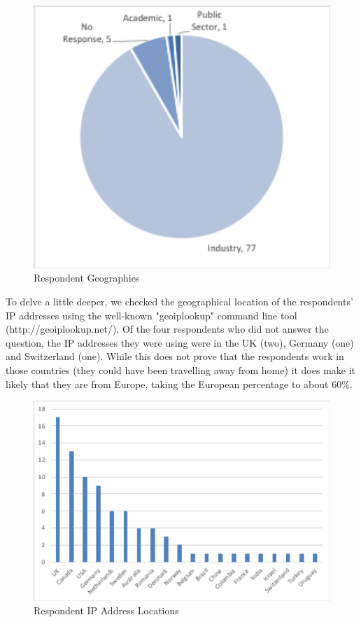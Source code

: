 \begin{figure}
\centering
\includegraphics[width=12cm]{Figures/prioritisation-workenv}
\caption{Respondent Geographies}
\label{figure:geographies}
\end{figure}

To delve a little deeper, we checked the geographical location of the respondents' IP addresses using the well-known "geoiplookup" command line tool (http://geoiplookup.net/).  Of the four respondents who did not answer the question, the IP addresses they were using were in the UK (two), Germany (one) and Switzerland (one).  While this does not prove that the respondents work in those countries (they could have been travelling away from home) it does make it likely that they are from Europe, taking the European percentage to about 60\%.
 
\begin{figure}
\centering
\includegraphics[width=12cm]{Figures/prioritisation-iplocation}
\caption{Respondent IP Address Locations}
\label{figure:iplocations}
\end{figure}

